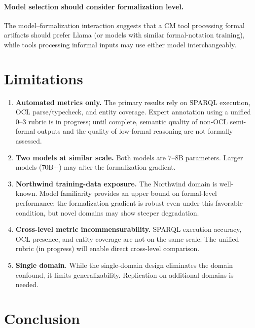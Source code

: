 \documentclass[runningheads]{llncs}
\begin{document}
\paragraph{Model selection should consider formalization level.} The model--formalization interaction suggests that a CM tool processing formal artifacts should prefer Llama (or models with similar formal-notation training), while tools processing informal inputs may use either model interchangeably.

\section{Limitations}
\label{sec:limitations}

\begin{enumerate}[noitemsep]
  \item \textbf{Automated metrics only.} The primary results rely on SPARQL execution, OCL parse/typecheck, and entity coverage. Expert annotation using a unified 0--3 rubric is in progress; until complete, semantic quality of non-OCL semi-formal outputs and the quality of low-formal reasoning are not formally assessed.
  \item \textbf{Two models at similar scale.} Both models are 7--8B parameters. Larger models (70B+) may alter the formalization gradient.
  \item \textbf{Northwind training-data exposure.} The Northwind domain is well-known. Model familiarity provides an upper bound on formal-level performance; the formalization gradient is robust even under this favorable condition, but novel domains may show steeper degradation.
  \item \textbf{Cross-level metric incommensurability.} SPARQL execution accuracy, OCL presence, and entity coverage are not on the same scale. The unified rubric (in progress) will enable direct cross-level comparison.
  \item \textbf{Single domain.} While the single-domain design eliminates the domain confound, it limits generalizability. Replication on additional domains is needed.
\end{enumerate}

\section{Conclusion}
\label{sec:conclusion}
\end{document}
